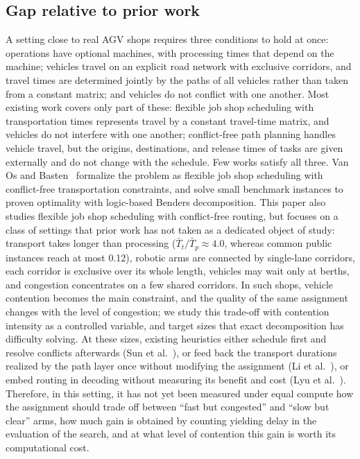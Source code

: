 \documentclass[manuscript,screen,review]{acmart}
\newcommand{\PubTtTpHi}{0.12}            %
\begin{document}
\subsection{Gap relative to prior work}

A setting close to real AGV shops requires three conditions to hold at once: operations have optional machines, with processing times that depend on the machine; vehicles travel on an explicit road network with exclusive corridors, and travel times are determined jointly by the paths of all vehicles rather than taken from a constant matrix; and vehicles do not conflict with one another.
Most existing work covers only part of these: flexible job shop scheduling with transportation times represents travel by a constant travel-time matrix, and vehicles do not interfere with one another; conflict-free path planning handles vehicle travel, but the origins, destinations, and release times of tasks are given externally and do not change with the schedule.
Few works satisfy all three.
Van Os and Basten~\cite{vanos2026exact} formalize the problem as flexible job shop scheduling with conflict-free transportation constraints, and solve small benchmark instances to proven optimality with logic-based Benders decomposition.
This paper also studies flexible job shop scheduling with conflict-free routing, but focuses on a class of settings that prior work has not taken as a dedicated object of study: transport takes longer than processing ($\bar{T}_t/\bar{T}_p\approx4.0$, whereas common public instances reach at most \PubTtTpHi{}), robotic arms are connected by single-lane corridors, each corridor is exclusive over its whole length, vehicles may wait only at berths, and congestion concentrates on a few shared corridors.
In such shops, vehicle contention becomes the main constraint, and the quality of the same assignment changes with the level of congestion; we study this trade-off with contention intensity as a controlled variable, and target sizes that exact decomposition has difficulty solving.
At these sizes, existing heuristics either schedule first and resolve conflicts afterwards (Sun et al.~\cite{sun2023integrated}), or feed back the transport durations realized by the path layer once without modifying the assignment (Li et al.~\cite{li2026framework}), or embed routing in decoding without measuring its benefit and cost (Lyu et al.~\cite{lyu2019approach}).
Therefore, in this setting, it has not yet been measured under equal compute how the assignment should trade off between ``fast but congested'' and ``slow but clear'' arms, how much gain is obtained by counting yielding delay in the evaluation of the search, and at what level of contention this gain is worth its computational cost.
\end{document}
